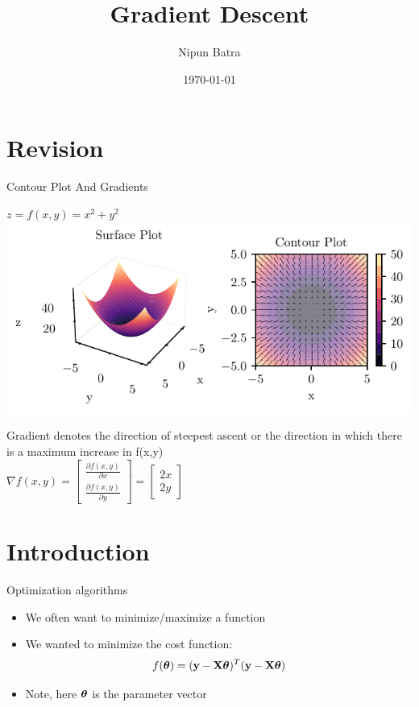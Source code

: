 \documentclass[usenames,dvipsnames]{beamer}
\title{Gradient Descent}
\date{\today}
\author{Nipun Batra}
\institute{IIT Gandhinagar}
\begin{document}
  \maketitle

  \section{Revision}
  \begin{frame}{Contour Plot And Gradients}
	
	$z = f(x,y) = x^{2} + y^{2}$\\
	
	\includegraphics[scale=0.9]{../../maths/assets/mathematical-ml/figures/contour-x_squared_plus_y_squared_quiver-with-gradient.pdf}
	
	


\pause Gradient denotes the direction of steepest ascent or the direction in which there is a maximum increase in f(x,y) \\
\pause $\nabla f(x, y) = \begin{bmatrix}
\frac{\partial f(x, y)}{\partial x}\\
\frac{\partial f(x, y)}{\partial y}
\end{bmatrix} = \begin{bmatrix} 2x\\2y
\end{bmatrix}$



\end{frame}

  \section{Introduction}

  \begin{frame}{Optimization algorithms}
    \begin{itemize}[<+->]
        \item We often want to minimize/maximize a function
        \item We wanted to minimize the cost function:
        \begin{equation}
            f(\boldsymbol{\theta}) = (\mathbf{y}-\mathbf{X}\boldsymbol{\theta})^T(\mathbf{y}-\mathbf{X}\boldsymbol{\theta})
        \end{equation}
        \item Note, here $\boldsymbol{\theta}$ is the parameter vector
        \end{itemize}   
  \end{frame}
\end{document}
